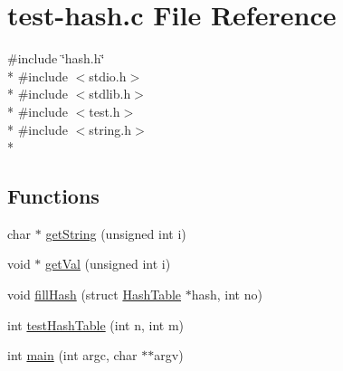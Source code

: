 \hypertarget{test-hash_8c}{\section{test-\/hash.c File Reference}
\label{test-hash_8c}
}
{\ttfamily \#include \char`\"{}hash.\+h\char`\"{}}\\*
{\ttfamily \#include $<$stdio.\+h$>$}\\*
{\ttfamily \#include $<$stdlib.\+h$>$}\\*
{\ttfamily \#include $<$test.\+h$>$}\\*
{\ttfamily \#include $<$string.\+h$>$}\\*
\subsection*{Functions}
\begin{DoxyCompactItemize}
\item 
char $\ast$ \hyperlink{test-hash_8c_acfc35001acec6c82086584928874453c}{get\+String} (unsigned int i)
\item 
void $\ast$ \hyperlink{test-hash_8c_ab9557c6ee9bf5b6a564f0430439c11a1}{get\+Val} (unsigned int i)
\item 
void \hyperlink{test-hash_8c_af095e387c5ea896fdbb2db86d6c3c0b9}{fill\+Hash} (struct \hyperlink{structHashTable}{Hash\+Table} $\ast$hash, int no)
\item 
int \hyperlink{test-hash_8c_a19f903d324f65314e5259a75d6b09b81}{test\+Hash\+Table} (int n, int m)
\item 
int \hyperlink{test-hash_8c_a3c04138a5bfe5d72780bb7e82a18e627}{main} (int argc, char $\ast$$\ast$argv)
\end{DoxyCompactItemize}


